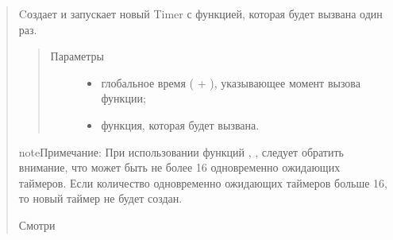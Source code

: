 \documentclass[a4paper,10pt,russian]{sphinxmanual}
\begin{document}
\begin{quote}
\begin{fulllineitems}
\begin{fulllineitems}
\begin{quote}
\begin{description}
\end{description}\end{quote}

\end{fulllineitems}


\begin{fulllineitems}
\label{\detokenize{programming/lua/lua:Timer.callAtGlobal}}
Cоздает и запускает новый Timer с функцией, которая будет вызвана один раз.
\begin{quote}\begin{description}
\item[{Параметры}] \leavevmode\begin{itemize}
\item {} 
 \textendash{} глобальное время ({\hyperref[\detokenize{programming/lua/lua:time}]{}} + {\hyperref[\detokenize{programming/lua/lua:deltaTime}]{}}), указывающее момент вызова функции;

\item {} 
 \textendash{} функция, которая будет вызвана.

\end{itemize}

\end{description}\end{quote}

\end{fulllineitems}


\end{fulllineitems}


\begin{sphinxadmonition}{note}{Примечание:}
При использовании функций , ,  следует обратить внимание,
что может быть не более 16 одновременно ожидающих таймеров. Если количество одновременно ожидающих таймеров больше 16, то новый таймер не будет создан.
\end{sphinxadmonition}


Смотри {\hyperref[\detokenize{programming/lua/lua:example}]{}}



\end{quote}
\end{document}
